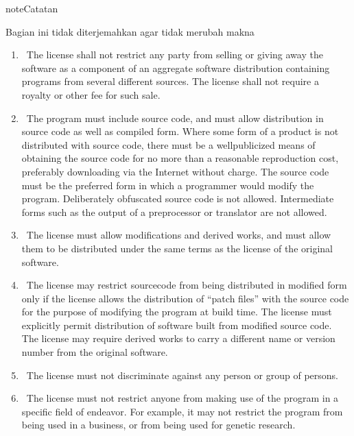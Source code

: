 \documentclass[letterpaper,10pt,english]{sphinxmanual}
\begin{document}
\begin{sphinxadmonition}{note}{Catatan}

Bagian ini tidak diterjemahkan agar tidak merubah makna
\end{sphinxadmonition}
\begin{enumerate}
%
\item {} 
  The license shall not restrict any party from selling or giving away the software as a component of an aggregate software distribution containing programs from several different sources. The license shall not require a royalty or other fee for such sale.

\item {} 
  The program must include source code, and must allow distribution in source code as well as compiled form. Where some form of a product is not distributed with source code, there must be a well\sphinxhyphen{}publicized means of obtaining the source code for no more than a reasonable reproduction cost, preferably downloading via the Internet without charge. The source code must be the preferred form in which a programmer would modify the program. Deliberately obfuscated source code is not allowed. Intermediate forms such as the output of a preprocessor or translator are not allowed.

\item {} 
  The license must allow modifications and derived works, and must allow them to be distributed under the same terms as the license of the original software.

\item {} 
  The license may restrict source\sphinxhyphen{}code from being distributed in modified form only if the license allows the distribution of “patch files” with the source code for the purpose of modifying the program at build time. The license must explicitly permit distribution of software built from modified source code. The license may require derived works to carry a different name or version number from the original software.

\item {} 
  The license must not discriminate against any person or group of persons.

\item {} 
  The license must not restrict anyone from making use of the program in a specific field of endeavor. For example, it may not restrict the program from being used in a business, or from being used for genetic research.


\end{enumerate}
\end{document}
